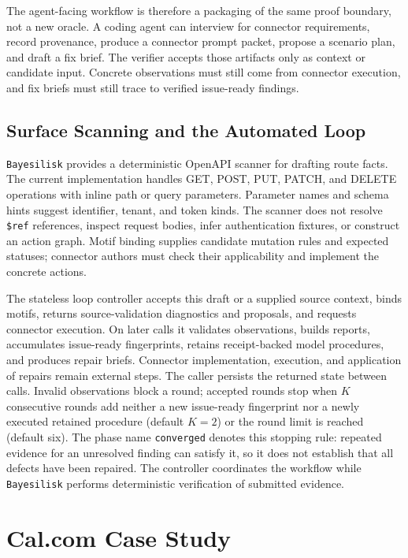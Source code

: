 \documentclass[10pt]{article}
\newcommand{\tool}{\texttt{Bayesilisk}\xspace}
\begin{document}
The agent-facing workflow is therefore a packaging of the same proof boundary,
not a new oracle. A coding agent can interview for connector requirements,
record provenance, produce a connector prompt packet, propose a scenario plan,
and draft a fix brief. The verifier accepts those artifacts only as context or
candidate input. Concrete observations must still come from connector
execution, and fix briefs must still trace to verified issue-ready findings.

\subsection{Surface Scanning and the Automated Loop}

\tool provides a deterministic OpenAPI scanner for drafting route facts. The
current implementation handles GET, POST, PUT, PATCH, and DELETE operations
with inline path or query parameters. Parameter names and schema hints suggest
identifier, tenant, and token kinds. The scanner does not resolve
\texttt{\$ref} references, inspect request bodies, infer authentication
fixtures, or construct an action graph. Motif binding supplies candidate
mutation rules and expected statuses; connector authors must check their
applicability and implement the concrete actions.

The stateless loop controller accepts this draft or a supplied source context,
binds motifs, returns source-validation diagnostics and proposals, and requests
connector execution. On later calls it validates observations, builds reports,
accumulates issue-ready fingerprints, retains receipt-backed model procedures,
and produces repair briefs. Connector
implementation, execution, and application of repairs remain external steps.
The caller persists the returned state between calls. Invalid observations
block a round; accepted rounds stop when \(K\) consecutive rounds add neither a new
issue-ready fingerprint nor a newly executed retained procedure (default \(K=2\)) or the round limit is reached
(default six). The phase name \texttt{converged} denotes this stopping rule:
repeated evidence for an unresolved finding can satisfy it, so it does not
establish that all defects have been repaired. The controller coordinates the
workflow while \tool performs deterministic verification of submitted evidence.

\section{Cal.com Case Study}
\end{document}
